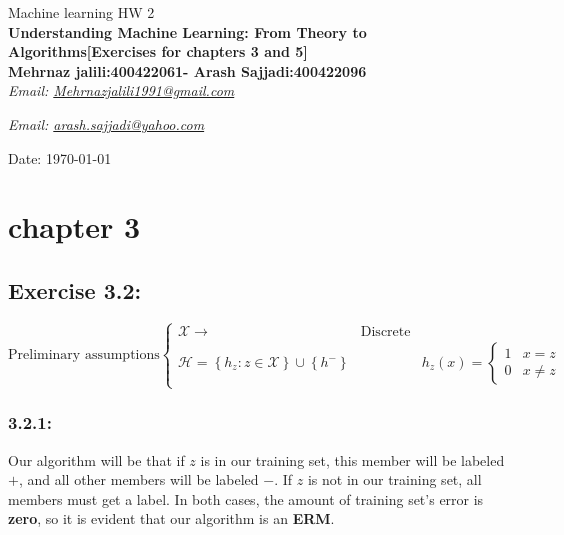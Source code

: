 \documentclass[]{book}
\begin{document}
\begin{center}
{\Large Machine learning \hspace{0.5cm} HW 2}\\
\textbf{\small{Understanding Machine Learning: From Theory to Algorithms}[Exercises for chapters 3 and 5]}\\
\textbf{Mehrnaz jalili:400422061-
Arash Sajjadi:400422096}\\ %
\textit{Email: \href{mailto:Mehrnazjalili1991@gmail.com}{Mehrnazjalili1991@gmail.com}} 

\textit{Email: \href{mailto:arash.sajjadi@yahoo.com}{arash.sajjadi@yahoo.com}} 


Date: \today %
\end{center}

\vspace{0.2 cm}

\section*{chapter 3}
\subsection*{Exercise 3.2:}

\begin{equation*}
\text{Preliminary assumptions}\left\{\begin{matrix}
 \mathcal{X} \longrightarrow & \text{Discrete} && \\ 
 \mathcal{H}=\left \{ h_z :z\in \mathcal{X} \right \} \cup \left \{ h^- \right \}&& h_z\left ( x \right )=\left\{\begin{matrix}
1 & x=z\\ 
0 & x\neq z
\end{matrix}\right.
\end{matrix}\right.
\end{equation*}

\subsubsection{3.2.1:}
Our algorithm will be that if $z$ is in our training set, this member will be labeled $+$, and all other members will be labeled $-$. If $z$ is not in our training set, all members must get a label. In both cases, the amount of training set's error is \textbf{zero}, so it is evident that our algorithm is an \textbf{ERM}.
\end{document}
